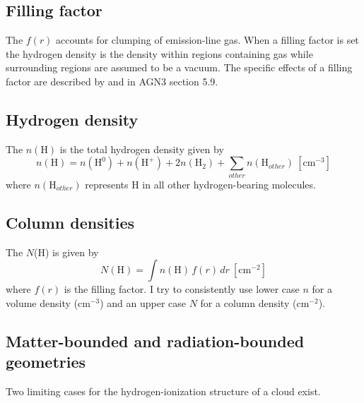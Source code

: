 \subsection{Filling factor}

The  $f(r)$ accounts for clumping
of emission-line gas.
When a filling factor is set the hydrogen density is the density within
regions containing gas while surrounding regions are assumed to be a vacuum.
The specific effects of a filling factor are described by \citet{Osterbrock1959} and in AGN3 section 5.9.

\subsection{Hydrogen density}

The  $n(\mathrm{H})$ is the
total hydrogen density given by
\begin{equation}
n(\mathrm{H}) = n(\mathrm{H}^0) + n(\mathrm{H}^+) + 2n(\mathrm{H}_2)+\sum_{other}
n(\mathrm{H}_{other})\ [\mathrm{cm}^{-3}]
\end{equation}
where $n(\mathrm{H}_{other})$ represents H in all other hydrogen-bearing molecules.

\subsection{Column densities}

The  $N$(H) is given by
\begin{equation}
N(\mathrm{H})= \int n (\mathrm{H})\, f(r) \, dr \ [\mathrm{cm}^{-2}]
\end{equation}
where $f(r)$ is the filling factor.   I try to consistently use lower case
$n$ for a volume density (cm$^{-3}$) and an upper case $N$ for
a column density (cm$^{-2}$).

\subsection{Matter-bounded and radiation-bounded geometries}

Two limiting cases for the hydrogen-ionization structure of a cloud exist.

